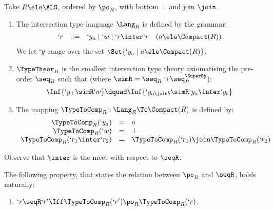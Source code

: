 \documentclass{lmcs}
\begin{document}
 \begin{defi} \label{def:typeTHeorFromDomain}
Take $R \ele \ALG$, ordered by $\po_R$, with bottom $\bot$ and join $\join$.

 \begin{enumerate}

 \item 
The intersection type language $\Lang_R$ is defined by the grammar:
%
 \[ \begin{array}{rcl@{\quad}l}
`r & :: = & `y_a \mid `w \mid `r \inter `r & (a \ele \Compact(R))
 \end{array} \]
We let $`y$ range over the set $\Set {`y_a \mid a \ele \Compact(R)}$.

 \item $\TypeTheor_R$ is the smallest intersection type theory axiomatising the pre-order $\seq_R$ such that (where $\simR = \seq_R \cap \seq^{\SuperOp}_R$):
%
 \[ \begin{array}{c@{\dquad}c}
\Inf	{`y_ \bot \simR `w}
	&
\Inf	{`y_{a \join b} \simR `y_a \inter `y_b}
 \end{array} \]

 \item 
The mapping $ \TypeToComp_R: \Lang_R\To\Compact(R)$ is defined by:
%
 \[ \begin{array}{rcl}
 \TypeToComp_R(`y_a) &=& a \\ 
 \TypeToComp_R(`w) &=& \bot \\ 
 \TypeToComp_R(`r_1 \inter `r_2) &=& \TypeToComp_R(`r_1) \join \TypeToComp_R(`r_2) 
 \end{array} \]

 \end{enumerate}
Observe that $\inter$ is the meet with respect to $\seqR$.
 \end{defi}

The following property, that states the relation between $\po_R$ and $\seqR$, holds naturally:

 \begin{lem} \label{lem:KRtheory}
 \begin{enumerate}

 \firstitem \label{lem:KRtheory-1}
	$`y_a \seqR `y_b \Iff b \po_R a$.

 \item \label{lem:KRtheory-2}
	$`r \seqR `r' \Iff \TypeToComp_R(`r') \po_R \TypeToComp_R(`r)$.

 \end{enumerate}
 \end{lem}
\end{document}

